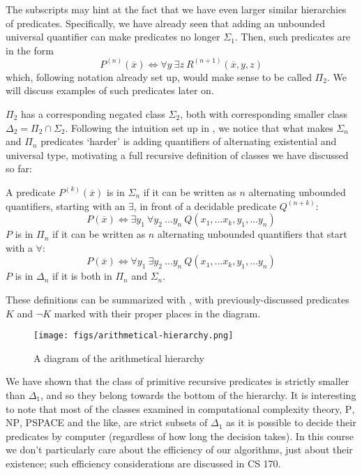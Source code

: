 The subscripts may hint at the fact that we have even larger similar hierarchies of predicates. Specifically, we have already seen that adding an unbounded universal quantifier can make predicates no longer $\Sigma_1$. Then, such predicates are in the form \[
    P^{(n)}(\overline{x}) \iff \forall y \ \exists z \ R^{(n+1)}(\overline{x}, y, z)
\]
which, following notation already set up, would make sense to be called $\Pi_2$. We will discuss examples of such predicates later on.

$\Pi_2$ has a corresponding negated class $\Sigma_2$, both with corresponding smaller class $\Delta_2 = \Pi_2 \cap \Sigma_2$. Following the intuition set up in , we notice that what makes $\Sigma_n$ and $\Pi_n$ predicates `harder' is adding quantifiers of alternating existential and universal type, motivating a full recursive definition of classes we have discussed so far:

\begin{definition}
A predicate $P^{(k)}(\overline{x})$ is in $\Sigma_n$ if it can be written as $n$ alternating unbounded quantifiers, starting with an $\exists$, in front of a decidable predicate $Q^{(n+k)}$: \[
    P(\overline{x}) \iff \exists y_1 \ \forall y_2 \ \ldots y_n \ Q(x_1, \ldots x_k, y_1, \ldots y_n)
\]
$P$ is in $\Pi_n$ if it can be written as $n$ alternating unbounded quantifiers that start with a $\forall$:
\[
    P(\overline{x}) \iff \forall y_1 \ \exists y_2 \ \ldots y_n \ Q(x_1, \ldots x_k, y_1, \ldots y_n)
\]
$P$ is in $\Delta_n$ if it is both in $\Pi_n$ and $\Sigma_n$.
\end{definition}

These definitions can be summarized with , with previously-discussed predicates $K$ and $\lnot K$ marked with their proper places in the diagram.

\begin{figure}[H]
\centering
    \texttt{[image: figs/arithmetical-hierarchy.png]}
\caption{A diagram of the arithmetical hierarchy}
\label{hierarchy-figure}
\end{figure}

We have shown that the class of primitive recursive predicates is strictly smaller than $\Delta_1$, and so they belong towards the bottom of the hierarchy. It is interesting to note that most of the classes examined in computational complexity theory, \textsc{P}, \textsc{NP}, \textsc{PSPACE} and the like, are strict subsets of $\Delta_1$ as it is possible to decide their predicates by computer (regardless of how long the decision takes). In this course we don't particularly care about the efficiency of our algorithms, just about their existence; such efficiency considerations are discussed in CS 170.

